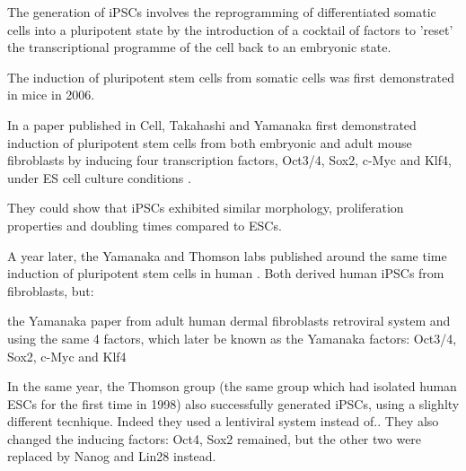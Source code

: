 The generation of iPSCs involves the reprogramming of differentiated somatic cells into a pluripotent state by the introduction of a cocktail of factors to 'reset' the transcriptional programme of the cell back to an embryonic state. 

The induction of pluripotent stem cells from somatic cells was first demonstrated in mice in 2006.

In a paper published in Cell, Takahashi and Yamanaka first demonstrated induction of pluripotent stem cells from both embryonic and adult mouse fibroblasts by inducing four transcription factors, Oct3/4, Sox2, c-Myc and Klf4, under ES cell culture conditions
\cite{takahashi2006induction}.

They could show that iPSCs exhibited similar morphology, proliferation properties and doubling times compared to ESCs.




A year later, the Yamanaka and Thomson labs published around the same time induction of pluripotent stem cells in human \cite{takahashi2007induction}.
Both derived human iPSCs from fibroblasts, but:

the Yamanaka paper from adult human dermal fibroblasts 
retroviral system and using the same 4 factors, which later be known as the Yamanaka factors: Oct3/4, Sox2, c-Myc and Klf4

In the same year, the Thomson group (the same group which had isolated human ESCs for the first time in 1998) also successfully generated iPSCs, using a slighlty different tecnhique.
Indeed they used a lentiviral system instead of..
They also changed the inducing factors: Oct4, Sox2 remained, but the other two were replaced by Nanog and Lin28 instead.

